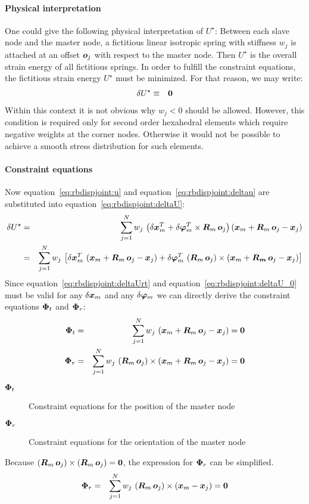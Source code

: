 \paragraph{Physical interpretation}
One could give the following physical interpretation of $U^{\star}$: Between each slave node and the master node, a fictitious linear isotropic spring
with stiffness $w_j$ is attached at an offset $\bm{o}_j$ with respect to the master node.
Then $U^{\star}$ is the overall strain energy of all fictitious springs.
In order to fulfill the constraint equations, the fictitious strain energy $U^{\star}$ must be minimized.
For that reason, we may write:
\begin{eqnarray}
\delta U^{\star} &  \equiv & \bm{0} \label{eq:rbdispjoint:deltaU_0}
\end{eqnarray}
Within this context it is not obvious why $w_j < 0$ should be allowed.
However, this condition is required only for second order hexahedral elements which require negative weights at the corner nodes.
Otherwise it would not be possible to achieve a smooth stress distribution for such elements.
\paragraph{Constraint equations}
Now equation~\ref{eq:rbdispjoint:u} and equation~\ref{eq:rbdispjoint:deltau} are substituted into equation~\ref{eq:rbdispjoint:deltaU}:
\begin{eqnarray}
\delta U^{\star} & = & \sum_{j=1}^{N} w_j \, \left(\delta\bm{x}_m^T + \delta\bm{\varphi}_m^T \times \bm{R}_m \, \bm{o}_j\right) \left( \bm{x}_m + \bm{R}_m \, \bm{o}_j - \bm{x}_j \right) \\
& = & \sum_{j=1}^{N} w_j \, \left[\delta\bm{x}_m^T\,\left(\bm{x}_m + \bm{R}_m \, \bm{o}_j - \bm{x}_j \right) + \delta\bm{\varphi}_m^T \, \left(\bm{R}_m \, \bm{o}_j \right)\times \left(\bm{x}_m + \bm{R_m} \, \bm{o}_j - \bm{x}_j \right)\right] \label{eq:rbdispjoint:deltaUrt}
\end{eqnarray}
Since equation~\ref{eq:rbdispjoint:deltaUrt} and equation~\ref{eq:rbdispjoint:deltaU_0} must be valid for any $\delta\bm{x}_m$ and any $\delta\bm{\varphi}_m$ we can directly derive the constraint equations $\bm{\Phi}_t$ and $\bm{\Phi}_r$:
\begin{eqnarray}
\bm{\Phi}_t & = & \sum_{j=1}^{N} w_j \, \left(\bm{x}_m + \bm{R}_m \, \bm{o}_j - \bm{x}_j\right) = \bm{0} \\
\bm{\Phi}_r & = & \sum_{j=1}^{N} w_j \, \left(\bm{R}_m \, \bm{o}_j \right)\times\left(\bm{x}_m + \bm{R}_m \, \bm{o}_j - \bm{x}_j \right) = \bm{0}
\end{eqnarray}
\begin{description}
\item[$\bm{\Phi}_t$] Constraint equations for the position of the master node
\item[$\bm{\Phi}_r$] Constraint equations for the orientation of the master node
\end{description}
Because $\left(\bm{R}_m \, \bm{o}_j\right) \times \left(\bm{R}_m \, \bm{o}_j\right) = \bm{0}$, the expression for $\bm{\Phi}_r$ can be simplified.
\begin{eqnarray}
\bm{\Phi}_r & = & \sum_{j=1}^{N} w_j \, \left(\bm{R}_m \, \bm{o}_j \right)\times\left(\bm{x}_m - \bm{x}_j \right) = \bm{0}
\end{eqnarray}

